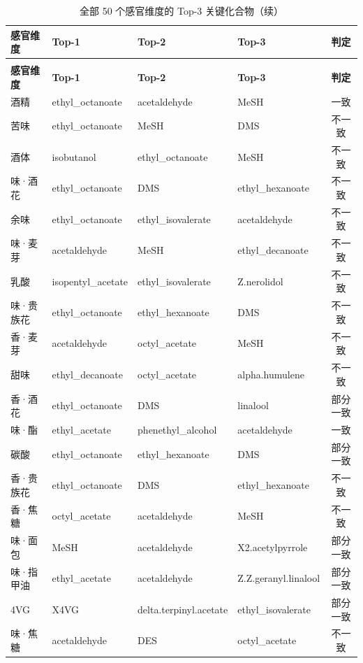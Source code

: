 \documentclass[zihao=-4,a4paper,UTF8,fontset=none]{ctexart}
\begin{document}
\begin{longtable}{@{}p{1.55cm}p{3.35cm}p{3.35cm}p{3.35cm}c@{}}
\caption{全部 50 个感官维度的 Top-3 关键化合物（交付答案）}\\
\toprule
\textbf{感官维度} & \textbf{Top-1} & \textbf{Top-2} & \textbf{Top-3} & \textbf{判定} \\ \midrule
\endfirsthead
\caption*{全部 50 个感官维度的 Top-3 关键化合物（续）}\\
\toprule
\textbf{感官维度} & \textbf{Top-1} & \textbf{Top-2} & \textbf{Top-3} & \textbf{判定} \\ \midrule
\endhead
\bottomrule
\endlastfoot
酒精 & ethyl\_octanoate & acetaldehyde & MeSH & 一致 \\
苦味 & ethyl\_octanoate & MeSH & DMS & 不一致 \\
酒体 & isobutanol & ethyl\_octanoate & MeSH & 不一致 \\
味·酒花 & ethyl\_octanoate & DMS & ethyl\_hexanoate & 不一致 \\
余味 & ethyl\_octanoate & ethyl\_isovalerate & acetaldehyde & 不一致 \\
味·麦芽 & acetaldehyde & MeSH & ethyl\_decanoate & 不一致 \\
乳酸 & isopentyl\_acetate & ethyl\_isovalerate & Z.nerolidol & 不一致 \\
味·贵族花 & ethyl\_octanoate & ethyl\_hexanoate & DMS & 不一致 \\
香·麦芽 & acetaldehyde & octyl\_acetate & MeSH & 不一致 \\
甜味 & ethyl\_decanoate & octyl\_acetate & alpha.humulene & 不一致 \\
香·酒花 & ethyl\_octanoate & DMS & linalool & 部分一致 \\
味·酯 & ethyl\_acetate & phenethyl\_alcohol & acetaldehyde & 一致 \\
碳酸 & ethyl\_octanoate & ethyl\_hexanoate & DMS & 部分一致 \\
香·贵族花 & ethyl\_octanoate & DMS & ethyl\_hexanoate & 不一致 \\
香·焦糖 & octyl\_acetate & acetaldehyde & MeSH & 不一致 \\
味·面包 & MeSH & acetaldehyde & X2.acetylpyrrole & 部分一致 \\
味·指甲油 & ethyl\_acetate & acetaldehyde & Z.Z.geranyl.linalool & 部分一致 \\
4VG & X4VG & delta.terpinyl.acetate & ethyl\_isovalerate & 部分一致 \\
味·焦糖 & acetaldehyde & DES & octyl\_acetate & 不一致 \\

\end{longtable}
\end{document}
